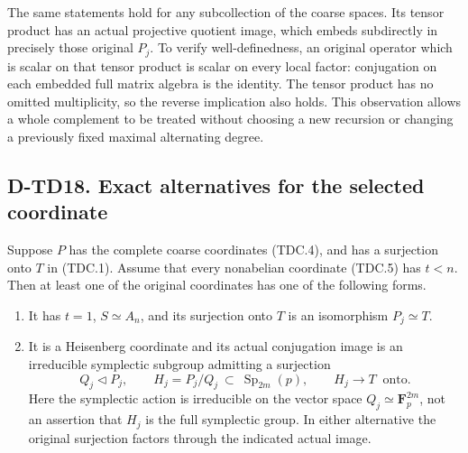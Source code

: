 The same statements hold for any subcollection of the coarse spaces.
Its tensor product has an actual projective quotient image, which
embeds subdirectly in precisely those original $P_j$. To verify
well-definedness, an original operator which is scalar on that
tensor product is scalar on every local factor: conjugation on
each embedded full matrix algebra is the identity. The tensor
product has no omitted multiplicity, so the reverse implication
also holds. This observation allows a whole complement to be
treated without choosing a new recursion or changing a previously
fixed maximal alternating degree.

\subsection*{D-TD18. Exact alternatives for the selected coordinate}

\begin{theorem}[D-TD18]
Suppose $P$ has the complete coarse coordinates (TDC.4), and has
a surjection onto $T$ in (TDC.1). Assume that every nonabelian
coordinate (TDC.5) has $t<n$. Then at least one of the original
coordinates has one of the following forms.
\begin{enumerate}
\item It has $t=1$, $S\simeq A_n$, and its surjection onto $T$
is an isomorphism $P_j\simeq T$.
\item It is a Heisenberg coordinate and its actual conjugation
image is an irreducible symplectic subgroup admitting a surjection
\[
 Q_j\triangleleft P_j,\qquad
 H_j=P_j/Q_j\ \subset\ \operatorname{Sp}_{2m}(p),
 \qquad H_j\longrightarrow T\ \text{ onto}.
 \tag{TDC.6}
\]
Here the symplectic action is irreducible on the vector space
$Q_j\simeq\mathbf F_p^{2m}$, not an assertion that $H_j$ is
the full symplectic group. In either alternative the original
surjection factors through the indicated actual image.
\end{enumerate}
\end{theorem}

